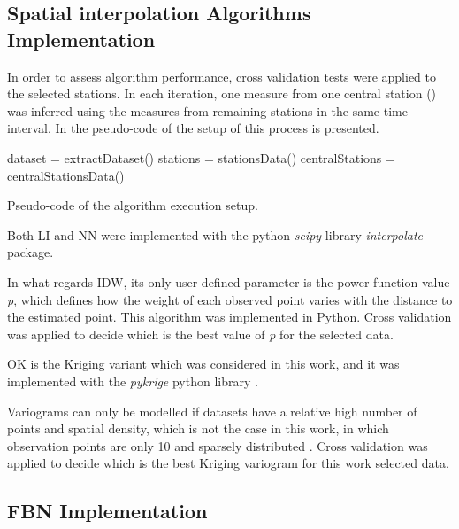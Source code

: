 \subsection{Spatial interpolation Algorithms Implementation}

In order to assess algorithm performance, cross validation tests were applied to the selected stations. In each iteration, one measure from one central station () was inferred using the measures from remaining stations in the same time interval. In  the pseudo-code of the setup of this process is presented.

\begin{center}
\begin{algorithm}[H]
\linespread{1.35}\selectfont
\SetAlgoLined
 dataset = extractDataset()\;
 stations = stationsData()\;
 centralStations = centralStationsData()\;
 \caption{Pseudo-code of the algorithm execution setup.}
 \label{main-pseudocode}
\end{algorithm}
\end{center}

Both LI and NN were implemented with the python \textit{scipy} library \textit{interpolate} package.

In what regards IDW, its only user defined parameter is the power function value \textit{p}, which defines how the weight of each observed point varies with the distance to the estimated point. This algorithm was implemented in Python.
Cross validation was applied to decide which is the best value of \textit{p} for the selected data.

OK is the Kriging variant which was considered in this work, and it was implemented with the \textit{pykrige} python library \cite{PyKrige2019}.

Variograms can only be modelled if datasets have a relative high number of points and spatial density, which is not the case in this work, in which observation points are only 10 and sparsely distributed \cite{Mesquita2009}.
Cross validation was applied to decide which is the best Kriging variogram for this work selected data.

\subsection{FBN Implementation}

